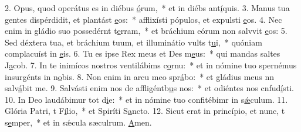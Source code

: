 2. Opus, quod operátus es in diébus \uline{ó}rum,~* et in diébs ant\uline{í}quis.
3. Manus tua gentes dispérdidit, et plantást \uline{e}os:~* afflixísti pópulos, et expulsti \uline{e}os.
4. Nec enim in gládio suo possedérnt t\uline{e}rram,~* et bráchium eórum non salvvit \uline{e}os:
5. Sed déxtera tua, et bráchium tuum, et illuminátio vults t\uline{u}i,~* quóniam complacuíst in \uline{e}is.
6. Tu es ipse Rex meus et Des m\uline{e}us:~* qui mandas saltes J\uline{a}cob.
7. In te inimícos nostros ventilábims c\uline{o}rnu:~* et in nómine tuo spernémus insurgénts in n\uline{o}bis.
8. Non enim in arcu meo spr\uline{á}bo:~* et gládius meus nn salv\uline{á}bit me.
9. Salvásti enim nos de affligéntb\uline{u}s nos:~* et odiéntes nos cnfud\uline{í}sti.
10. In Deo laudábimur tot d\uline{i}e:~* et in nómine tuo confitébimr in s\uline{ǽ}culum.
11. Glória Patri, t F\uline{í}lio,~* et Spiríti S\uline{a}ncto.
12. Sicut erat in princípio, et nunc, t s\uline{e}mper,~* et in sǽcula sæculrum. \uline{A}men.
